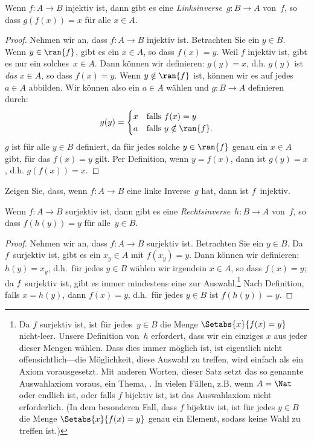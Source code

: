 \documentclass[../../../include/open-logic-section]{subfiles}
\begin{document}
\begin{prop}
Wenn $f\colon A \to B$ injektiv ist, dann gibt es eine 
\emph{Linksinverse}~$g\colon B \to A$ von~$f$, so dass $g(f(x)) = x$ für alle $x
\in A$.
\end{prop}

\begin{proof}
Nehmen wir an, dass $f\colon A \to B$ injektiv ist. Betrachten Sie ein $y \in B$.
Wenn $y \in \ran{f}$, gibt es ein $x \in A$, so dass $f(x) = y$. Weil
$f$ injektiv ist, gibt es nur ein solches~$x \in A$. Dann können wir
definieren: $g(y) = x$, d.h. $g(y)$ ist \emph{das} $x \in A$, so dass $f(x)
= y$.  Wenn $y \notin \ran{f}$ ist, können wir es auf jedes~$a \in A$ abbilden. Wir können also
ein $a \in A$ wählen und $g \colon B \to A$ definieren durch:
\[
g(y) = \begin{cases}
    x & \text{falls $f(x) = y$}\\
    a & \text{falls $y \notin \ran{f}$.}
\end{cases}
\]
$g$ ist für alle $y \in B$ definiert, da für jedes solche $y \in \ran{f}$
genau ein $x \in A$ gibt, für das $f(x) = y$ gilt. Per Definition, wenn
$y = f(x)$, dann ist $g(y) = x$, d.h. $g(f(x)) = x$.
\end{proof}

\begin{prob}
Zeigen Sie, dass, wenn $f\colon A \to B$ eine linke Inverse~$g$ hat, dann ist $f$~injektiv.
\end{prob}

\begin{prop}
    Wenn $f \colon A \to B$ surjektiv ist, dann gibt es eine
    \emph{Rechtsinverse}~$h\colon B \to A$ von~$f$, so dass $f(h(y)) =
    y$ für alle~$y \in B$.
\end{prop}

\begin{proof}
Nehmen wir an, dass $f\colon A \to B$ surjektiv ist. Betrachten Sie ein $y \in
B$. Da $f$~surjektiv ist, gibt es ein $x_y \in A$ mit $f(x_y)
= y$.  Dann können wir definieren: $h(y) = x_y$, d.h.\ für jedes $y \in B$ wählen wir
irgendein $x \in A$, so dass $f(x) = y$; da $f$~surjektiv ist,
gibt es immer mindestens eine zur Auswahl.\footnote{Da $f$
surjektiv ist, ist für jedes~$y \in B$ die Menge $\Setabs{x}{f(x) = y}$
nicht-leer. Unsere Definition von~$h$ erfordert, dass wir ein einziges $x$
aus jeder dieser Mengen wählen. Dass dies immer möglich ist, ist eigentlich nicht
offensichtlich---die Möglichkeit, diese Auswahl zu treffen, wird einfach als ein Axiom vorausgesetzt. 
Mit anderen Worten, dieser Satz setzt das so genannte Auswahlaxiom voraus, ein Thema,
. 
In vielen Fällen, z.B. wenn $A = \Nat$ oder endlich ist, oder falls $f$ bijektiv ist,
ist das Auswahlaxiom nicht erforderlich. (In dem besonderen Fall, dass $f$ bijektiv ist,
ist für jedes $y \in B$ die Menge 
$\Setabs{x}{f(x) = y}$ genau ein Element, sodass keine Wahl zu treffen ist.)} 
Nach Definition, falls $x = h(y)$,
dann $f(x) = y$, d.h.\ für jedes $y \in B$ ist $f(h(y)) = y$.
\end{proof}
\end{document}

